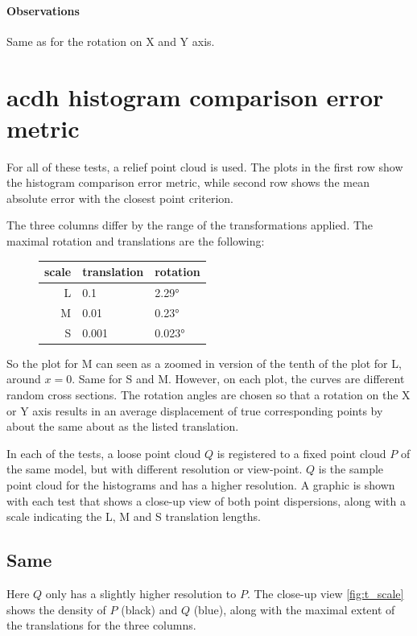 \paragraph{Observations} Same as for the rotation on X and Y axis.


\newpage

\section{\Gls{acdh} histogram comparison error metric} \label{sec:chi_err}
For all of these tests, a relief point cloud is used. The plots in the first row show the histogram comparison error metric, while second row shows the mean absolute error with the closest point criterion.

The three columns differ by the range of the transformations applied. The maximal rotation and translations are the following:

\begin{figure}[H]
\centering
\begin{tabularx}{.4\textwidth}{|r|X|X|} \hline
scale  & translation & rotation \\ \hline
L      & 0.1         & 2.29\si{\degree} \\
M      & 0.01        & 0.23\si{\degree} \\
S      & 0.001       & 0.023\si{\degree} \\ \hline
\end{tabularx}
\end{figure}

So the plot for M can seen as a zoomed in version of the tenth of the plot for L, around $x = 0$. Same for S and M. However, on each plot, the curves are different random cross sections. The rotation angles are chosen so that a rotation on the X or Y axis results in an average displacement of true corresponding points by about the same about as the listed translation.

In each of the tests, a loose point cloud $Q$ is registered to a fixed point cloud $P$ of the same model, but with different resolution or view-point. $Q$ is the sample point cloud for the histograms and has a higher resolution. A graphic is shown with each test that shows a close-up view of both point dispersions, along with a scale indicating the L, M and S translation lengths.





\subsection{Same}
Here $Q$ only has a slightly higher resolution to $P$. The close-up view \ref{fig:t_scale} shows the density of $P$ (black) and $Q$ (blue), along with the maximal extent of the translations for the three columns. 

